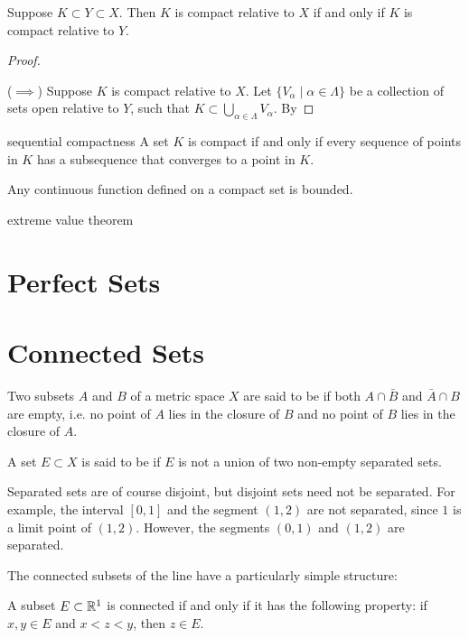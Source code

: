 \begin{proposition}
Suppose $K\subset Y\subset X$. Then $K$ is compact relative to $X$ if and only if $K$ is compact relative to $Y$.
\end{proposition}

\begin{proof} \

($\implies$) Suppose $K$ is compact relative to $X$. Let $\{V_\alpha\mid\alpha\in\Lambda\}$ be a collection of sets open relative to $Y$, such that $K\subset\bigcup_{\alpha\in\Lambda}V_\alpha$. By 
\end{proof}

sequential compactness
A set $K$ is compact if and only if every sequence of points in $K$ has a subsequence that converges to a point in $K$.

Any continuous function defined on a compact set is bounded.

extreme value theorem

\section{Perfect Sets}


\section{Connected Sets}
\begin{definition}
Two subsets $A$ and $B$ of a metric space $X$ are said to be  if both $A\cap\bar{B}$ and $\bar{A}\cap B$ are empty, i.e. no point of $A$ lies in the closure of $B$ and no point of $B$ lies in the closure of $A$.

A set $E\subset X$ is said to be  if $E$ is not a union of two non-empty separated sets. 
\end{definition}

\begin{remark}
Separated sets are of course disjoint, but disjoint sets need not be separated. For example, the interval $[0,1]$ and the segment $(1,2)$ are not separated, since $1$ is a limit point of $(1,2)$. However, the segments $(0,1)$ and $(1,2)$ are separated.
\end{remark}

The connected subsets of the line have a particularly simple structure: 

\begin{proposition}
A subset $E\subset\mathbb R^1$ is connected if and only if it has the following property: if $x,y\in E$ and $x<z<y$, then $z\in E$.
\end{proposition}

